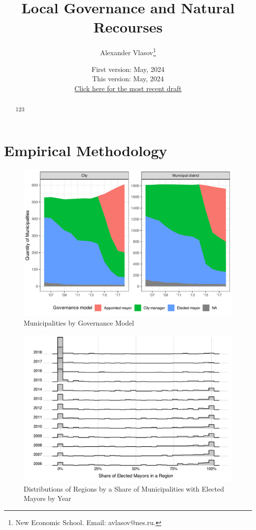 \documentclass[12pt]{article}
\title{Local Governance and Natural Recourses}
\author{Alexander Vlasov\thanks{New Economic School. Email: avlasov@nes.ru.}}
\date{\normalsize First version: May, 2024\\\vspace{1ex} This version: May, 2024\\ \vspace{1ex}
\href{https:}{Click here for the most recent draft} }
\numberwithin{equation}{section}
\numberwithin{table}{section}
\numberwithin{figure}{section}
\begin{document}
\maketitle
\begin{abstract}
    123
\end{abstract}





\section{Empirical Methodology}



\begin{figure}\centering
    \caption{Municipalities by Governance Model}
    \includegraphics[width=\textwidth]{Figures/model_by_year_plot.pdf}
\end{figure}

\begin{figure}\centering
    \caption{Distributions of Regions by a Share of Municipalities with Elected Mayors by Year}
    \includegraphics[width=\textwidth]{Figures/ridgeplot_models.pdf}
\end{figure}
\end{document}
